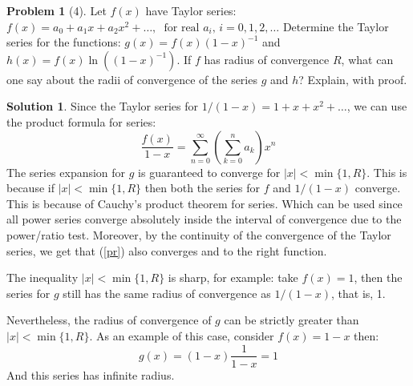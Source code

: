 \documentclass{article}
\theoremstyle{definition}
\newtheorem*{soln}{Solution}
\newtheorem*{prob}{Problem}
\theoremstyle{theorem}
\begin{document}
\begin{prob}[4]
Let $f(x)$ have Taylor series:  $ f(x) = a_0 + a_1 x + a_2x^2  + \dots, \hspace{7pt}\textrm{for real $a_i$, $i = 0, 1, 2, \dots$}$
Determine the Taylor series for the functions: $\displaystyle{ g(x)   = f(x)(1 - x)^{-1}}$ and $\displaystyle{ h(x) = f(x) \ln\left((1 - x)^{-1}\right)}.$
If $f$ has radius of convergence $R$, what can one say about the radii of convergence of the series $g$ and $h$?  Explain, with proof.
\end{prob}
\begin{soln}
    Since the Taylor series for $1/(1-x)=1+x+x^2+\ldots$, we can use the product formula for series:
    \begin{equation}\label{pr}
\frac {f(x)}{1-x} = \sum_{n=0 }^\infty\left(\sum_{k=0 }^n a_k\right) x^n\end{equation}
     The series expansion for $g$ is guaranteed to converge for  $|x|<\min\{1, R  \}$.   This is because if $|x|<\min\{1,R  \}$ then both the series for $f$ and $1/(1-x)$ converge. This is because of Cauchy's product theorem for series. Which can be used since all power series converge absolutely inside the interval of convergence due to the power/ratio test.  Moreover, by the continuity of  the convergence of the Taylor series, we get that (\ref{pr}) also converges and to the right  function. 
     
      The  inequality $|x|<\min\{1,R  \}$ is sharp, for example: take $f(x)=1$, then the series for $g$ still has the same radius of convergence as $1/(1-x)$, that is, 1.

      Nevertheless, the radius of convergence of $g$ can be strictly greater than $|x|<\min\{1,R  \}$. As an example of this case, consider $f(x) = 1-x$ then:
      $$g(x) = (1-x)\frac 1{1-x} = 1$$
      And this series has infinite radius. 
\end{soln}
\vspace{1in}
\end{document}
